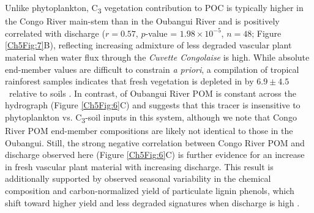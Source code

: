 Unlike phytoplankton, C\textsubscript{3} vegetation contribution to POC is typically higher in the Congo River main-stem than in the Oubangui River and is positively correlated with discharge ($r = 0.57$, $p$-value = $1.98 \times 10^{-5}$, $n = 48$; Figure \ref{Ch5Fig:7}B), reflecting increasing admixture of less degraded vascular plant material when water flux through the \textit{Cuvette Congolaise} is high. While absolute end-member  values are difficult to constrain \textit{a priori}, a compilation of tropical rainforest samples indicates that fresh vegetation is depleted in  by $6.9 \pm 4.5$\textperthousand\ relative to soils \citep{Martinelli:1999ta}. In contrast,  of Oubangui River POM is constant across the hydrograph (Figure \ref{Ch5Fig:6}C) and suggests that this tracer is insensitive to phytoplankton vs. C\textsubscript{3}-soil inputs in this system, although we note that Congo River POM end-member compositions are likely not identical to those in the Oubangui. Still, the strong negative correlation between Congo River POM  and discharge observed here (Figure \ref{Ch5Fig:6}C) is further evidence for an increase in fresh vascular plant material with increasing discharge. This result is additionally supported by observed seasonal variability in the chemical composition and carbon-normalized yield of particulate lignin phenols, which shift toward higher yield and less degraded signatures when discharge is high \citep{Spencer:2016ho}.

